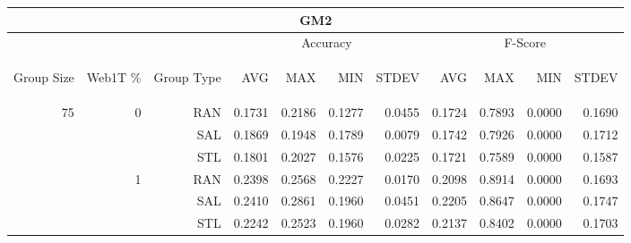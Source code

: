 \begin{center}
\begin{table}[htbp] 
 \begin{center}
\begin{tabular}{ | r | r | r | r | r | r | r | r | r | r | r |}
\hline
\multicolumn{11}{|c|}{GM2}\\
\hline
 & & & \multicolumn{4}{|c|}{Accuracy} & \multicolumn{4}{|c|}{F-Score}\\ \cline{4-11}
\begin{sideways}Group Size\end{sideways} & \begin{sideways}Web1T \%\end{sideways} & \begin{sideways}Group Type\end{sideways} & \begin{sideways}AVG\end{sideways} & \begin{sideways}MAX\end{sideways} & \begin{sideways}MIN\end{sideways} & \begin{sideways}STDEV\end{sideways} & \begin{sideways}AVG\end{sideways} & \begin{sideways}MAX\end{sideways} & \begin{sideways}MIN\end{sideways} & \begin{sideways}STDEV\end{sideways}\\
\hline
\multirow{15}{*}{75}
 & \multirow{3}{*}{0} & RAN & 0.1731 & 0.2186 & 0.1277 & 0.0455 & 0.1724 & 0.7893 & 0.0000 & 0.1690\\ \cline{3-11}
 &   & SAL & 0.1869 & 0.1948 & 0.1789 & 0.0079 & 0.1742 & 0.7926 & 0.0000 & 0.1712\\ \cline{3-11}
 &   & STL & 0.1801 & 0.2027 & 0.1576 & 0.0225 & 0.1721 & 0.7589 & 0.0000 & 0.1587\\ \cline{2-11}
 & \multirow{3}{*}{1} & RAN & 0.2398 & 0.2568 & 0.2227 & 0.0170 & 0.2098 & 0.8914 & 0.0000 & 0.1693\\ \cline{3-11}
 &   & SAL & 0.2410 & 0.2861 & 0.1960 & 0.0451 & 0.2205 & 0.8647 & 0.0000 & 0.1747\\ \cline{3-11}
 &   & STL & 0.2242 & 0.2523 & 0.1960 & 0.0282 & 0.2137 & 0.8402 & 0.0000 & 0.1703\\ \cline{2-11}

\end{tabular}
\end{center}
\end{table}
\end{center}
